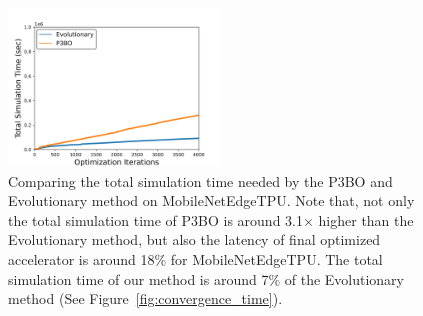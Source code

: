 \begin{figure}[t!]
    \centering
    \includegraphics[width=0.5\textwidth]{chapters/prime/figs/convergence_time_v2_evolutionary_vs_p3bo.png}
    \caption{Comparing the total simulation time needed by the P3BO and Evolutionary method on MobileNetEdgeTPU. Note that, not only the total simulation time of P3BO is around 3.1$\times$ higher than the Evolutionary method, but also the latency of final optimized accelerator is around 18\% for MobileNetEdgeTPU. The total simulation time of our method is around 7\% of the Evolutionary method (See Figure~\ref{fig:convergence_time}).}
    \label{fig:converg_p3bo_evolutionary}
    \vspace{-0.1in}
\end{figure}
%

%



